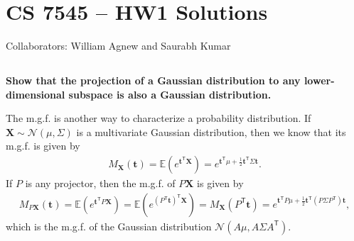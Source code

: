 \documentclass[a4paper,12pt]{article}
\theoremstyle{remark}
\newcommand{\bs}{\boldsymbol}
\newcommand{\transpose}{\mathsf{T}}
\begin{document}
\section*{CS 7545 -- HW1 Solutions}
Collaborators: William Agnew and Saurabh Kumar
\subsection{}
    \boldmath\textbf{Show that the projection of a Gaussian distribution to any lower-dimensional subspace is also a Gaussian distribution.
    }\unboldmath \par
    The m.g.f. is another way to characterize a probability distribution. If $\bs{X} \sim \mathcal{N}(\mu, \Sigma)$ is a multivariate Gaussian distribution, then we know that its m.g.f. is given by
    \begin{align*}
        M_{\bs{X}}(\bs{t}) = \mathbb{E} \left( e^{\bs{t}^\transpose \bs{X}} \right) = e^{\bs{t}^\transpose \mu + \frac{1}{2} \bs{t}^\transpose \Sigma \bs{t}}.
    \end{align*}
    If $P$ is any projector, then the m.g.f. of $P\bs{X}$ is given by
    \begin{align*}
        M_{P\bs{X}}(\bs{t}) = \mathbb{E} \left( e^{\bs{t}^\transpose P\bs{X}} \right) = \mathbb{E} \left( e^{(P^\transpose \bs{t})^\transpose \bs{X}} \right) = M_{\bs{X}}(P^\transpose \bs{t}) = e^{\bs{t}^\transpose P \mu + \frac{1}{2} \bs{t}^\transpose (P \Sigma P^\transpose) \bs{t}},
    \end{align*}
    which is the m.g.f. of the Gaussian distribution $\mathcal{N}(A\mu, A\Sigma A^\transpose)$.
\end{document}
